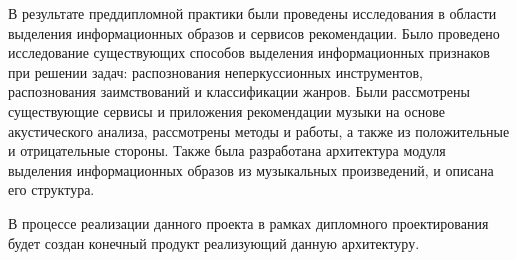 \label{sec:outro}
В результате преддипломной практики были проведены исследования в области выделения информационных образов и сервисов рекомендации. Было проведено исследование существующих способов выделения информационных признаков при решении задач: распознования неперкуссионных инструментов, распознования заимствований и классификации жанров. Были рассмотрены существующие сервисы и приложения рекомендации музыки на основе акустического анализа, рассмотрены методы и работы, а также из положительные и отрицательные стороны. Также была разработана архитектура модуля выделения информационных образов из музыкальных произведений, и описана его структура. 

В процессе реализации данного проекта в рамках дипломного проектирования будет создан конечный продукт реализующий данную архитектуру. 